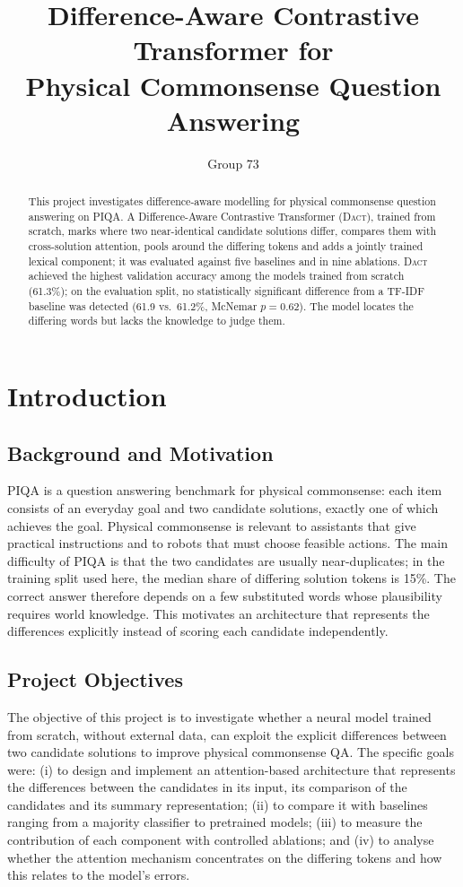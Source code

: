 \documentclass[11pt]{article}
\title{Difference-Aware Contrastive Transformer for\\Physical Commonsense Question Answering}
\author{Group 73}
\newcommand{\dact}{\textsc{Dact}}
\begin{document}
\maketitle

\begin{abstract}
This project investigates difference-aware modelling for physical commonsense question answering on PIQA. A Difference-Aware Contrastive Transformer (\dact{}), trained from scratch, marks where two near-identical candidate solutions differ, compares them with cross-solution attention, pools around the differing tokens and adds a jointly trained lexical component; it was evaluated against five baselines and in nine ablations. \dact{} achieved the highest validation accuracy among the models trained from scratch (61.3\%); on the evaluation split, no statistically significant difference from a TF-IDF baseline was detected (61.9 vs.\ 61.2\%, McNemar $p{=}0.62$). The model locates the differing words but lacks the knowledge to judge them.
\end{abstract}

\section{Introduction}

\subsection{Background and Motivation}
PIQA \cite{bisk2020piqa} is a question answering benchmark for physical commonsense: each item consists of an everyday goal and two candidate solutions, exactly one of which achieves the goal. Physical commonsense is relevant to assistants that give practical instructions and to robots that must choose feasible actions. The main difficulty of PIQA is that the two candidates are usually near-duplicates; in the training split used here, the median share of differing solution tokens is 15\%. The correct answer therefore depends on a few substituted words whose plausibility requires world knowledge. This motivates an architecture that represents the differences explicitly instead of scoring each candidate independently.

\subsection{Project Objectives}
The objective of this project is to investigate whether a neural model trained from scratch, without external data, can exploit the explicit differences between two candidate solutions to improve physical commonsense QA. The specific goals were: (i) to design and implement an attention-based architecture that represents the differences between the candidates in its input, its comparison of the candidates and its summary representation; (ii) to compare it with baselines ranging from a majority classifier to pretrained models; (iii) to measure the contribution of each component with controlled ablations; and (iv) to analyse whether the attention mechanism concentrates on the differing tokens and how this relates to the model's errors.
\end{document}

